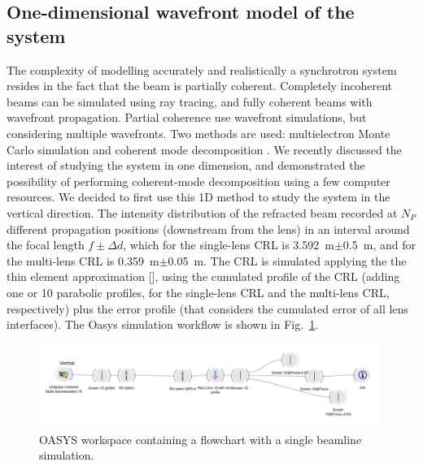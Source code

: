 \documentclass[preprint]{iucr}
\newcommand{\todo}[1]{{\color{red}[TODO: "#1'']}}
\begin{document}
\subsection{One-dimensional wavefront model of the system}\label{sec:descriptionsystem}
The complexity of modelling accurately and realistically a synchrotron system resides in the fact that the beam is partially coherent. Completely incoherent beams can be simulated using ray tracing, and fully coherent beams with wavefront propagation. Partial coherence use wavefront simulations, but considering multiple wavefronts. Two methods are used: multielectron Monte Carlo simulation \cite{codeSRW_ME} and coherent mode decomposition \cite{Glass2017}. We recently discussed the interest of studying the system in one dimension, and demonstrated the possibility of performing coherent-mode decomposition \cite{multioptics}  using a few computer resources. We decided to first use this 1D method to study the system in the vertical direction. 
The intensity distribution of the refracted beam recorded at $N_P$ different propagation positions (downstream from the lens) in an interval around the focal length $f\pm\Delta d$, which for the single-lens CRL is \SI{3.592}{\meter}$\pm$\SI{0.5}{\meter}, and for the multi-lens CRL is \SI{0.359}{\meter}$\pm$\SI{0.05}{\meter}.
The CRL is simulated applying the the thin element approximation [\cite{SanchezdelRio:ay5600, Celestre:yi5119}], using the cumulated profile of the CRL (adding one or 10 parabolic profiles, for the single-lens CRL and the multi-lens CRL, respectively) plus the error profile (that considers the cumulated error of all lens interfaces).
The Oasys \cite{codeOASYS} simulation workflow is shown in Fig.~\ref{fig:oasys}. 

\begin{figure}\label{fig:oasys}
    \includegraphics[width=0.99\textwidth]{figures/oasys.png}
    \caption{OASYS workspace containing a flowchart with a single beamline simulation. 
    }
\end{figure}
\end{document}
